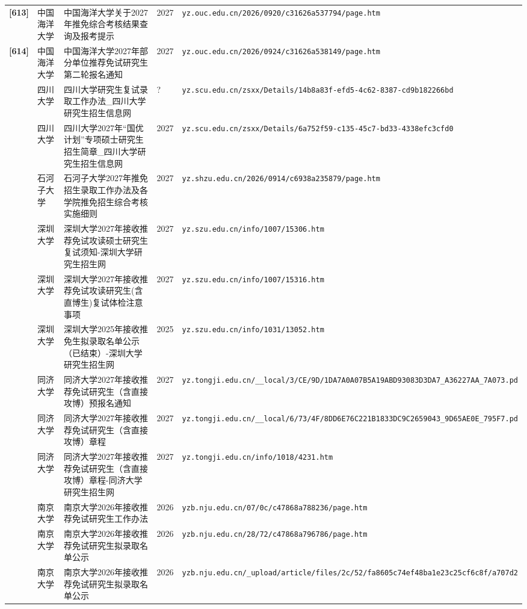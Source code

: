 {\begin{longtable}{@{}p{1.15cm}p{2.9cm}p{6.3cm}p{0.85cm}p{5.0cm}@{}}
\textbf{[613]} & 中国海洋大学 & 中国海洋大学关于2027年推免综合考核结果查询及报考提示 & 2027 & \texttt{yz.ouc.edu.cn/2026/0920/c31626a537794/page.htm} \\
\textbf{[614]} & 中国海洋大学 & 中国海洋大学2027年部分单位推荐免试研究生第二轮报名通知 & 2027 & \texttt{yz.ouc.edu.cn/2026/0924/c31626a538149/page.htm} \\
[0] & 四川大学 & 四川大学研究生复试录取工作办法\_四川大学研究生招生信息网 & ? & \texttt{yz.scu.edu.cn/zsxx/Details/14b8a83f-efd5-4c62-8387-cd9b182266bd} \\
[0] & 四川大学 & 四川大学2027年“国优计划”专项硕士研究生招生简章\_四川大学研究生招生信息网 & 2027 & \texttt{yz.scu.edu.cn/zsxx/Details/6a752f59-c135-45c7-bd33-4338efc3cfd0} \\
[0] & 石河子大学 & 石河子大学2027年推免招生录取工作办法及各学院推免招生综合考核实施细则 & 2027 & \texttt{yz.shzu.edu.cn/2026/0914/c6938a235879/page.htm} \\
[0] & 深圳大学 & 深圳大学2027年接收推荐免试攻读硕士研究生复试须知-深圳大学研究生招生网 & 2027 & \texttt{yz.szu.edu.cn/info/1007/15306.htm} \\
[0] & 深圳大学 & 深圳大学2027年接收推荐免试攻读研究生(含直博生)复试体检注意事项 & 2027 & \texttt{yz.szu.edu.cn/info/1007/15316.htm} \\
[0] & 深圳大学 & 深圳大学2025年接收推免生拟录取名单公示（已结束）-深圳大学研究生招生网 & 2025 & \texttt{yz.szu.edu.cn/info/1031/13052.htm} \\
[0] & 同济大学 & 同济大学2027年接收推荐免试研究生（含直接攻博）预报名通知 & 2027 & \texttt{yz.tongji.edu.cn/\_\_local/3/CE/9D/1DA7A0A07B5A19ABD93083D3DA7\_A36227AA\_7A073.pd} \\
[0] & 同济大学 & 同济大学2027年接收推荐免试研究生（含直接攻博）章程 & 2027 & \texttt{yz.tongji.edu.cn/\_\_local/6/73/4F/8DD6E76C221B1833DC9C2659043\_9D65AE0E\_795F7.pd} \\
[0] & 同济大学 & 同济大学2027年接收推荐免试研究生（含直接攻博）章程-同济大学研究生招生网 & 2027 & \texttt{yz.tongji.edu.cn/info/1018/4231.htm} \\
[0] & 南京大学 & 南京大学2026年接收推荐免试研究生工作办法 & 2026 & \texttt{yzb.nju.edu.cn/07/0c/c47868a788236/page.htm} \\
[0] & 南京大学 & 南京大学2026年接收推荐免试研究生拟录取名单公示 & 2026 & \texttt{yzb.nju.edu.cn/28/72/c47868a796786/page.htm} \\
[0] & 南京大学 & 南京大学2026年接收推荐免试研究生拟录取名单公示 & 2026 & \texttt{yzb.nju.edu.cn/\_upload/article/files/2c/52/fa8605c74ef48ba1e23c25cf6c8f/a707d2} \\

\end{longtable}}
